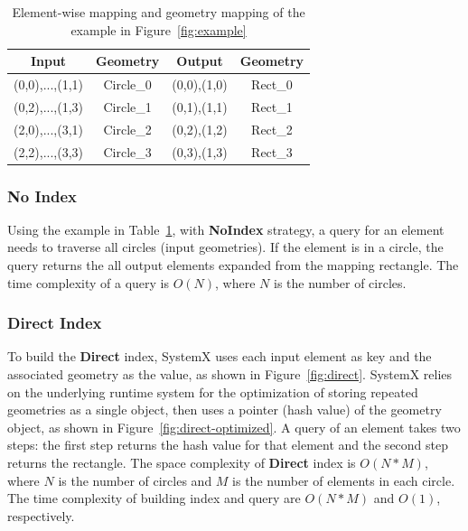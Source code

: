 \documentclass{sig-alternate}
\begin{document}
\begin{table}[h]
\begin{center}
    \caption{Element-wise mapping and geometry mapping of the example in Figure~\ref{fig:example}}
    \begin{scriptsize}
    \begin{tabular}{ | c | c | c | c |}
    \hline
    Input & Geometry & Output & Geometry \\ \hline \hline
    (0,0),...,(1,1) & Circle\_0 & (0,0),(1,0) & Rect\_0 \\ \hline
    (0,2),...,(1,3) & Circle\_1 & (0,1),(1,1) & Rect\_1 \\ \hline
    (2,0),...,(3,1) & Circle\_2 & (0,2),(1,2) & Rect\_2 \\ \hline
    (2,2),...,(3,3) & Circle\_3 & (0,3),(1,3) & Rect\_3 \\ \hline
    \end{tabular}
    \end{scriptsize}
    \label{tb:example}
\end{center}   
\end{table} 

\subsubsection{No Index}
Using the example in Table~\ref{tb:example}, with {\bf NoIndex} strategy, a query for an element needs to traverse all circles (input geometries).
If the element is in a circle, the query returns the all output elements expanded from the mapping rectangle.
The time complexity of a query is $O(N)$, where $N$ is the number of circles. 

\subsubsection{Direct Index}
To build the {\bf Direct} index, SystemX uses each input element as key and the associated geometry as the value, as shown in Figure~\ref{fig:direct}.
SystemX relies on the underlying runtime system for the optimization of storing repeated geometries as a single object,
then uses a pointer (hash value) of the geometry object, as shown in Figure~\ref{fig:direct-optimized}.
A query of an element takes two steps: the first step returns the hash value for that element and the second step returns the rectangle. 
The space complexity of {\bf Direct} index is $O(N*M)$, where $N$ is the number of circles and $M$ is the number of elements in each circle.
The time complexity of building index and query are $O(N*M)$ and $O(1)$, respectively.
\end{document}
